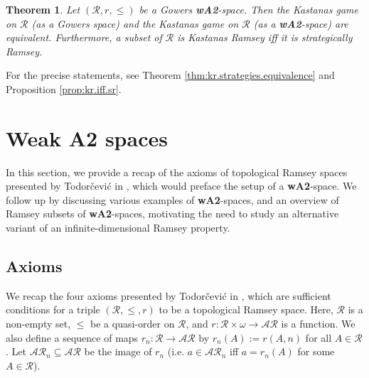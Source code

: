 \documentclass[11pt,reqno]{amsart}
\theoremstyle{plain}
\numberwithin{equation}{section}
\newtheorem{theorem}{Theorem}[section]
\theoremstyle{definition}
\newcommand{\cal}{\mathcal}
\begin{document}
\begin{theorem}
    Let $(\cal{R},r,\leq)$ be a Gowers \textbf{wA2}-space. Then the Kastanas game on $\cal{R}$ (as a Gowers space) and the Kastanas game on $\cal{R}$ (as a \textbf{wA2}-space) are equivalent. Furthermore, a subset of $\cal{R}$ is Kastanas Ramsey iff it is strategically Ramsey.
\end{theorem}

For the precise statements, see Theorem \ref{thm:kr.strategies.equivalence} and Proposition \ref{prop:kr.iff.sr}.

\section{Weak \textbf{A2} spaces}
In this section, we provide a recap of the axioms of topological Ramsey spaces presented by Todor\v{c}evi\'{c} in \cite{T10}, which would preface the setup of a \textbf{wA2}-space. We follow up by discussing various examples of \textbf{wA2}-spaces, and an overview of Ramsey subsets of \textbf{wA2}-spaces, motivating the need to study an alternative variant of an infinite-dimensional Ramsey property.

\subsection{Axioms} 
We recap the four axioms presented by Todor\v{c}evi\'{c} in \cite{T10}, which are sufficient conditions for a triple $(\cal{R},\leq,r)$ to be a topological Ramsey space. Here, $\cal{R}$ is a non-empty set, $\leq$ be a quasi-order on $\cal{R}$, and $r : \cal{R} \times \omega \to \cal{AR}$ is a function. We also define a sequence of maps $r_n : \cal{R} \to \cal{AR}$ by $r_n(A) := r(A,n)$ for all $A \in \cal{R}$. Let $\cal{AR}_n \subseteq \cal{AR}$ be the image of $r_n$ (i.e. $a \in \cal{AR}_n$ iff $a = r_n(A)$ for some $A \in \cal{R}$).
\end{document}
